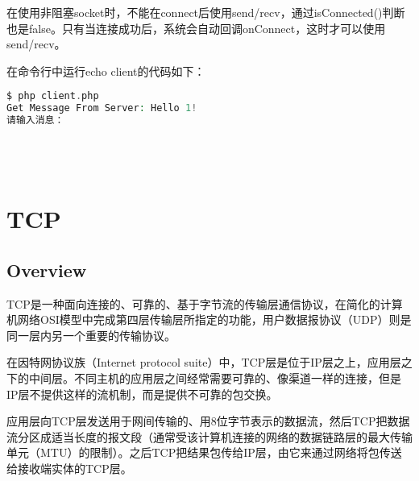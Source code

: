 在使用非阻塞socket时，不能在connect后使用send/recv，通过isConnected()判断也是false。只有当连接成功后，系统会自动回调onConnect，这时才可以使用send/recv。

在命令行中运行echo client的代码如下：



\begin{lstlisting}[language=PHP]
$ php client.php
Get Message From Server: Hello 1!
请输入消息：
\end{lstlisting}




\begin{lstlisting}[language=PHP]

\end{lstlisting}




\begin{lstlisting}[language=PHP]

\end{lstlisting}




\begin{lstlisting}[language=PHP]

\end{lstlisting}




\begin{lstlisting}[language=PHP]

\end{lstlisting}






\chapter{TCP}


\section{Overview}



 TCP是一种面向连接的、可靠的、基于字节流的传输层通信协议，在简化的计算机网络OSI模型中完成第四层传输层所指定的功能，用户数据报协议（UDP）则是同一层内另一个重要的传输协议。
 
 在因特网协议族（Internet protocol suite）中，TCP层是位于IP层之上，应用层之下的中间层。不同主机的应用层之间经常需要可靠的、像渠道一样的连接，但是IP层不提供这样的流机制，而是提供不可靠的包交换。

应用层向TCP层发送用于网间传输的、用8位字节表示的数据流，然后TCP把数据流分区成适当长度的报文段（通常受该计算机连接的网络的数据链路层的最大传输单元（MTU）的限制）。之后TCP把结果包传给IP层，由它来通过网络将包传送给接收端实体的TCP层。

